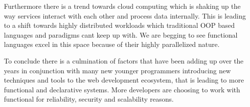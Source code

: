 Furthermore there is a trend towards cloud computing which is shaking up the way
services interact with each other and process data internally.
This is leading to a shift towards highly distributed workloads which traditional
OOP based languages and paradigms cant keep up with. We are begging to see functional
languages excel in this space because of their highly parallelized nature.\parencite{chechina2012design}

To conclude there is a culmination of factors that have been adding up over the years
in conjunction with many new younger programmers introducing new techniques and
tools to the web development ecosystem, that is leading to more functional and declarative
systems. More developers are choosing to work with functional for reliability, security
and scalability reasons. 
